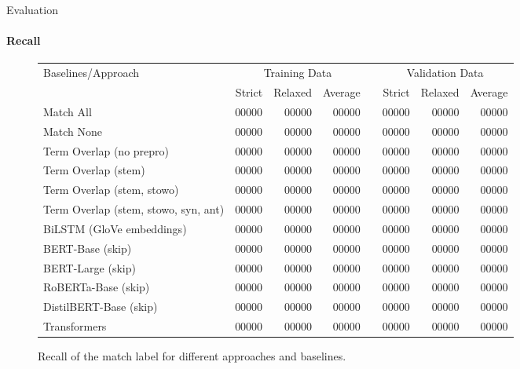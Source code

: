 \documentclass[english,handout]{mlutalk}
\begin{document}
\begin{frame}{Evaluation}
  \framesubtitle{Recall}
  \begin{figure}
    \centering
    \caption{Recall of the match label for different approaches and baselines.}
    \tiny
    \begin{tabular}{lrrrlrrr}
      \toprule
      Baselines/Approach & \multicolumn{3}{c}{Training Data} & & \multicolumn{3}{c}{Validation Data}\\ \cmidrule{2-4} \cmidrule{6-8}
        & Strict & Relaxed & Average & & Strict & Relaxed & Average\\
      \midrule
      Match All                           & 00000 & 00000 & 00000 & & 00000 & 00000 & 00000\\
      Match None                          & 00000 & 00000 & 00000 & & 00000 & 00000 & 00000\\
      Term Overlap (no prepro)            & 00000 & 00000 & 00000 & & 00000 & 00000 & 00000\\
      Term Overlap (stem)                 & 00000 & 00000 & 00000 & & 00000 & 00000 & 00000\\
      Term Overlap (stem, stowo)          & 00000 & 00000 & 00000 & & 00000 & 00000 & 00000\\
      Term Overlap (stem, stowo, syn, ant)& 00000 & 00000 & 00000 & & 00000 & 00000 & 00000\\
      \midrule
      BiLSTM (GloVe embeddings)           & 00000 & 00000 & 00000 & & 00000 & 00000 & 00000\\
      BERT-Base (skip)                    & 00000 & 00000 & 00000 & & 00000 & 00000 & 00000\\
      BERT-Large (skip)                   & 00000 & 00000 & 00000 & & 00000 & 00000 & 00000\\
      RoBERTa-Base (skip)                 & 00000 & 00000 & 00000 & & 00000 & 00000 & 00000\\
      DistilBERT-Base (skip)              & 00000 & 00000 & 00000 & & 00000 & 00000 & 00000\\
      Transformers                        & 00000 & 00000 & 00000 & & 00000 & 00000 & 00000\\
      \bottomrule
    \end{tabular}
  \end{figure}
\end{frame}
\end{document}
